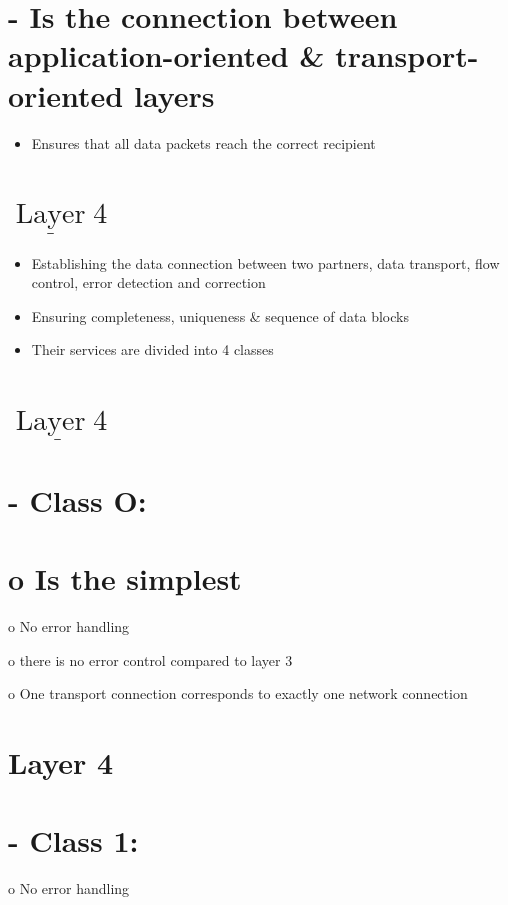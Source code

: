 \documentclass[10pt]{article}
\begin{document}
\section{- Is the connection between application-oriented \& transport-oriented layers}
\begin{itemize}
  \item Ensures that all data packets reach the correct
recipient
\end{itemize}

\section{$\underline{\operatorname{Layer}} 4$}
\begin{itemize}
  \item Establishing the data connection between two partners, data transport, flow control, error detection and correction

  \item Ensuring completeness, uniqueness \& sequence of data blocks

  \item Their services are divided into 4 classes

\end{itemize}

\section{$\underline{\operatorname{Layer} 4}$}
\section{- Class O:}
\section{o Is the simplest}
o No error handling

o there is no error control compared to layer 3

o One transport connection corresponds to exactly one network connection

\section{Layer 4}
\section{- Class 1:}
o No error handling
\end{document}
